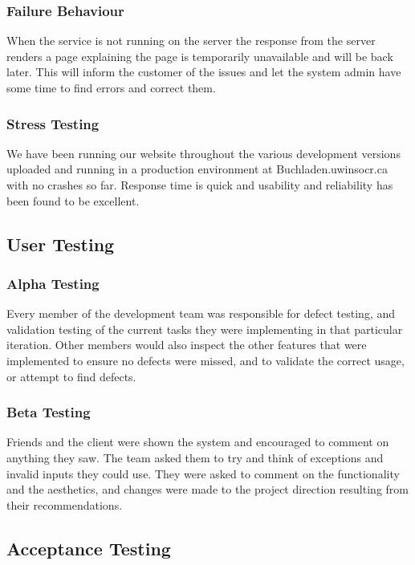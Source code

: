 \documentclass[11pt]{article}
\begin{document}
		\subsubsection{Failure Behaviour}

			When the service is not running on the server the response from the server renders a page explaining the page is temporarily unavailable and will be back later. 
			This will inform the customer of the issues and let the system admin have some time to find errors and correct them.

		\subsubsection{Stress Testing}

			We have been running our website throughout the various development versions uploaded and running in a production environment at Buchladen.uwinsocr.ca with no crashes so far. 
			Response time is quick and usability and reliability has been found to be excellent. 

	\subsection{User Testing}

		\subsubsection{Alpha Testing}

			Every member of the development team was responsible for defect testing, and validation testing of the current tasks they were implementing in that particular iteration. 
			Other members would also inspect the other features that were implemented to ensure no defects were missed, and to validate the correct usage, or attempt to find defects.

		\subsubsection{Beta Testing}

			Friends and the client were shown the system and encouraged to comment on anything they saw. 
			The team asked them to try and think of exceptions and invalid inputs they could use. 
			They were asked to comment on the functionality and the aesthetics, and changes were made to the project direction resulting from their recommendations.

	\subsection{Acceptance Testing}
\end{document}
